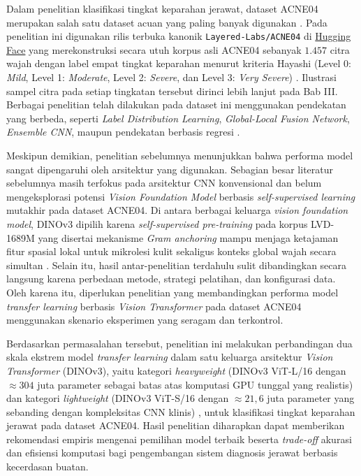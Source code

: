 Dalam penelitian klasifikasi tingkat keparahan jerawat, dataset ACNE04 merupakan salah satu dataset acuan yang paling banyak digunakan \cite{wu2019}. Pada penelitian ini digunakan rilis terbuka kanonik \texttt{Layered-Labs/ACNE04} di \href{https://huggingface.co/datasets/Layered-Labs/ACNE04}{Hugging Face} yang merekonstruksi secara utuh korpus asli ACNE04 sebanyak $1.457$ citra wajah dengan label empat tingkat keparahan menurut kriteria Hayashi (Level 0: \textit{Mild}, Level 1: \textit{Moderate}, Level 2: \textit{Severe}, dan Level 3: \textit{Very Severe}) \cite{wu2019, layeredlabs2026acne04}. Ilustrasi sampel citra pada setiap tingkatan tersebut dirinci lebih lanjut pada Bab III. Berbagai penelitian telah dilakukan pada dataset ini menggunakan pendekatan yang berbeda, seperti \textit{Label Distribution Learning}, \textit{Global-Local Fusion Network}, \textit{Ensemble CNN}, maupun pendekatan berbasis regresi \cite{wu2019,lin2022,liu2022,alzahrani2022,lopez2023}.

Meskipun demikian, penelitian sebelumnya menunjukkan bahwa performa model sangat dipengaruhi oleh arsitektur yang digunakan. Sebagian besar literatur sebelumnya masih terfokus pada arsitektur CNN konvensional dan belum mengeksplorasi potensi \textit{Vision Foundation Model} berbasis \textit{self-supervised learning} mutakhir pada dataset ACNE04. Di antara berbagai keluarga \textit{vision foundation model}, DINOv3 dipilih karena \textit{self-supervised pre-training} pada korpus LVD-1689M yang disertai mekanisme \textit{Gram anchoring} mampu menjaga ketajaman fitur spasial lokal untuk mikrolesi kulit sekaligus konteks global wajah secara simultan \cite{simeoni2025dinov3}. Selain itu, hasil antar-penelitian terdahulu sulit dibandingkan secara langsung karena perbedaan metode, strategi pelatihan, dan konfigurasi data. Oleh karena itu, diperlukan penelitian yang membandingkan performa model \textit{transfer learning} berbasis \textit{Vision Transformer} pada dataset ACNE04 menggunakan skenario eksperimen yang seragam dan terkontrol.

Berdasarkan permasalahan tersebut, penelitian ini melakukan perbandingan dua skala ekstrem model \textit{transfer learning} dalam satu keluarga arsitektur \textit{Vision Transformer} (DINOv3), yaitu kategori \textit{heavyweight} (DINOv3 ViT-L/16 dengan $\approx 304$ juta parameter sebagai batas atas komputasi GPU tunggal yang realistis) dan kategori \textit{lightweight} (DINOv3 ViT-S/16 dengan $\approx 21,6$ juta parameter yang sebanding dengan kompleksitas CNN klinis) \cite{simeoni2025dinov3}, untuk klasifikasi tingkat keparahan jerawat pada dataset ACNE04. Hasil penelitian diharapkan dapat memberikan rekomendasi empiris mengenai pemilihan model terbaik beserta \textit{trade-off} akurasi dan efisiensi komputasi bagi pengembangan sistem diagnosis jerawat berbasis kecerdasan buatan.

